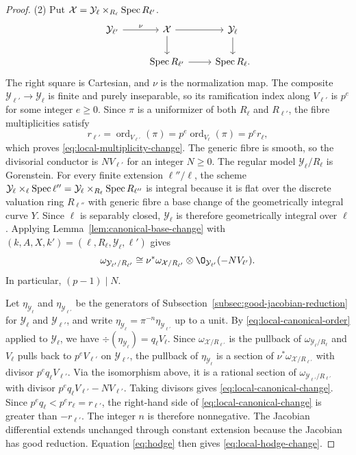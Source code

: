 \begin{proof}
(2) Put $\mathcal X=\mathcal Y_{\ell}\times_{R_{\ell}}\operatorname{Spec} R_{\ell'}$.
\[
  \begin{tikzcd}
    \mathcal Y_{\ell'} \arrow[r,"\nu"] & \mathcal X \arrow[r] \arrow[d] & \mathcal Y_{\ell} \arrow[d]\\
    & \Spec R_{\ell'} \arrow[r] & \Spec R_{\ell}.
  \end{tikzcd}
\]
The right square is Cartesian, and $\nu$ is the normalization map.
The composite $\mathcal Y_{\ell'}\to\mathcal Y_{\ell}$ is finite and purely inseparable, so its ramification index along $V_{\ell'}$ is $p^e$ for some integer $e\geq0$.
Since $\pi$ is a uniformizer of both $R_{\ell}$ and $R_{\ell'}$, the fibre multiplicities satisfy
\[
  r_{\ell'} = \operatorname{ord}_{V_{\ell'}}(\pi)
  = p^e\operatorname{ord}_{V_{\ell}}(\pi) = p^e r_{\ell},
\]
which proves \eqref{eq:local-multiplicity-change}.
The generic fibre is smooth, so the divisorial conductor is $NV_{\ell'}$ for an integer $N\geq0$.
The regular model $\mathcal Y_{\ell}/R_{\ell}$ is Gorenstein.
For every finite extension $\ell''/\ell$, the scheme $\mathcal Y_{\ell}\times_{\ell}\operatorname{Spec}\ell'' = \mathcal Y_{\ell}\times_{R_{\ell}}\operatorname{Spec} R_{\ell''}$ is integral because it is flat over the discrete valuation ring $R_{\ell''}$ with generic fibre a base change of the geometrically integral curve $Y$.
Since $\ell$ is separably closed, $\mathcal Y_{\ell}$ is therefore geometrically integral over $\ell$ \cite[Tags~ and~]{Stacks}.
Applying Lemma~\ref{lem:canonical-base-change} with $(k,A,X,k') = (\ell,R_{\ell},\mathcal Y_{\ell},\ell')$ gives
\[
  \omega_{\mathcal Y_{\ell'}/R_{\ell'}}
  \cong\nu^*\omega_{\mathcal X/R_{\ell'}}\otimes\O_{\mathcal Y_{\ell'}}(-NV_{\ell'}).
\]
In particular, $(p-1)\mid N$.

Let $\eta_{\mathcal Y_{\ell}}$ and $\eta_{\mathcal Y_{\ell'}}$ be the generators of Subsection~\ref{subsec:good-jacobian-reduction} for $\mathcal Y_{\ell}$ and $\mathcal Y_{\ell'}$, and write $\eta_{\mathcal Y_{\ell}}=\pi^{-n}\eta_{\mathcal Y_{\ell'}}$ up to a unit.
By \eqref{eq:local-canonical-order} applied to $\mathcal Y_{\ell}$, we have $\div(\eta_{\mathcal Y_{\ell}}) = q_{\ell}V_{\ell}$.
Since $\omega_{\mathcal X/R_{\ell'}}$ is the pullback of $\omega_{\mathcal Y_{\ell}/R_{\ell}}$ and $V_{\ell}$ pulls back to $p^eV_{\ell'}$ on $\mathcal Y_{\ell'}$, the pullback of $\eta_{\mathcal Y_{\ell}}$ is a section of $\nu^*\omega_{\mathcal X/R_{\ell'}}$ with divisor $p^e q_{\ell}V_{\ell'}$.
Via the isomorphism above, it is a rational section of $\omega_{\mathcal Y_{\ell'}/R_{\ell'}}$ with divisor $p^e q_{\ell}V_{\ell'}-NV_{\ell'}$.
Taking divisors gives \eqref{eq:local-canonical-change}.
Since $p^e q_{\ell}<p^e r_{\ell}=r_{\ell'}$, the right-hand side of \eqref{eq:local-canonical-change} is greater than $-r_{\ell'}$.
The integer $n$ is therefore nonnegative.
The Jacobian differential extends unchanged through constant extension because the Jacobian has good reduction.
Equation \eqref{eq:hodge} then gives \eqref{eq:local-hodge-change}.
\end{proof}

